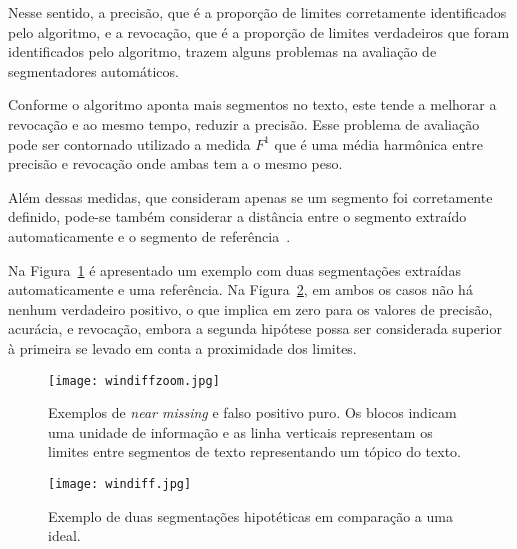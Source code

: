 Nesse sentido, 
%
a precisão, que é a proporção de limites corretamente identificados pelo algoritmo, e 
%
a revocação, que é a proporção de limites verdadeiros que foram identificados pelo algoritmo,
%
trazem alguns problemas na avaliação de segmentadores automáticos.
 	
	
Conforme o algoritmo aponta mais segmentos no texto, este tende a melhorar a revocação e ao mesmo tempo, reduzir a precisão. Esse problema de avaliação pode ser contornado utilizado a medida $F^1$ que é uma média harmônica entre precisão e revocação onde ambas tem a o mesmo peso. 

Além dessas medidas, que consideram apenas se um segmento foi corretamente definido, pode-se também considerar a distância entre o segmento extraído automaticamente e o segmento de referência~\cite{Kern2009}.


Na Figura~\ref{fig:exemplosegmentacaozoom} é apresentado um exemplo com duas segmentações extraídas automaticamente e uma referência. Na Figura~\ref{fig:exemplosegmentacao}, em ambos os casos não há nenhum verdadeiro positivo, o que implica em zero para os valores de precisão, acurácia, e revocação, embora a segunda hipótese possa ser considerada superior à primeira se levado em conta a proximidade dos limites.



  \begin{figure}[!h]

	\centering
	\texttt{[image: windiffzoom.jpg]}
	\caption{Exemplos de \textit{near missing} e falso positivo puro. Os blocos indicam uma unidade de informação e as linha verticais representam os limites entre segmentos de texto representando um tópico do texto. }
	\label{fig:exemplosegmentacaozoom}

  \end{figure}
  
  \begin{figure}[!h]

	\centering
	\texttt{[image: windiff.jpg]}
	\caption{
	Exemplo de duas segmentações hipotéticas em comparação a uma ideal. 
	}
	\label{fig:exemplosegmentacao}

  \end{figure}
  

